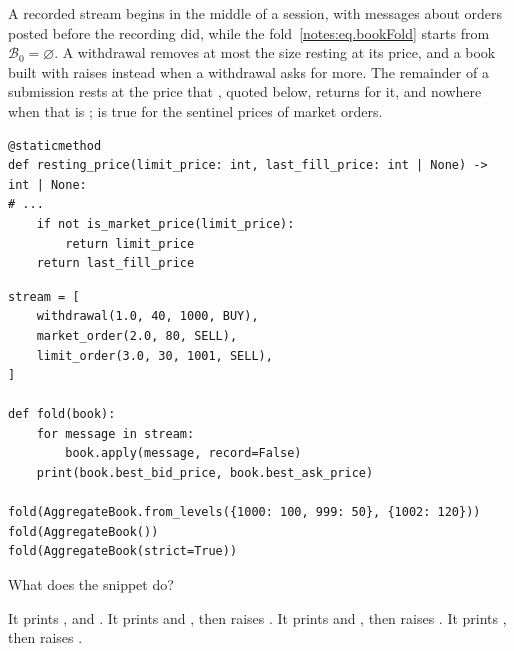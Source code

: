 \begin{question}
\label{question.recordedStreamFoldedFromEmpty}
A recorded stream begins in the middle of a session,
with messages about orders posted before the recording did,
while the fold~\eqref{notes:eq.bookFold} starts from $\mathcal{B}_0 = \varnothing$.
A withdrawal removes at most the size resting at its price,
and a book built with  raises  instead
when a withdrawal asks for more.
The remainder of a submission rests at the price that , quoted below,
returns for it, and nowhere when that is ;
 is true for the sentinel prices of market orders.
\begin{lstlisting}[caption={\protect\codehl{unito26.lob.orderbook.AggregateBook.resting\_price}, its docstring elided.}, label=listing.recordedStreamFoldedFromEmptyRestingPrice]
@staticmethod
def resting_price(limit_price: int, last_fill_price: int | None) -> int | None:
# ...
    if not is_market_price(limit_price):
        return limit_price
    return last_fill_price
\end{lstlisting}
\begin{lstlisting}[caption={One stream, three opening books}, label=listing.recordedStreamFoldedFromEmptyFold]
stream = [
    withdrawal(1.0, 40, 1000, BUY),
    market_order(2.0, 80, SELL),
    limit_order(3.0, 30, 1001, SELL),
]

def fold(book):
    for message in stream:
        book.apply(message, record=False)
    print(book.best_bid_price, book.best_ask_price)

fold(AggregateBook.from_levels({1000: 100, 999: 50}, {1002: 120}))
fold(AggregateBook())
fold(AggregateBook(strict=True))
\end{lstlisting}
What does the snippet do?
\begin{choices}
 \choice It prints ,  and .
 \correctchoice It prints  and ,
  then raises .
 \choice It prints  and ,
  then raises .
 \choice It prints , then raises .
\end{choices}
\end{question}

